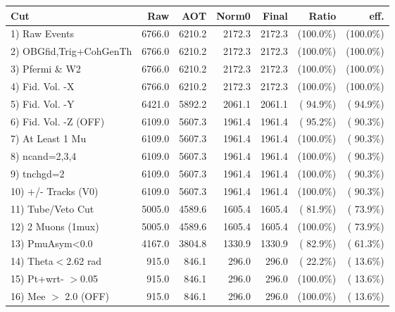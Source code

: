  \begin{table}[h!]\centering
 \begin{tabular}{||l||r|r|r|r|r|r||}
 \hline
 \hline
 Cut & Raw & AOT & Norm0 & Final & Ratio & eff.       \\
 \hline
  1) Raw Events           &       6766.0 &       6210.2 &       2172.3 &       2172.3 & (100.0\%) & (100.0\%) \\
  2) OBGfid,Trig+CohGenTh &       6766.0 &       6210.2 &       2172.3 &       2172.3 & (100.0\%) & (100.0\%) \\
  3) Pfermi \& W2         &       6766.0 &       6210.2 &       2172.3 &       2172.3 & (100.0\%) & (100.0\%) \\
  4) Fid. Vol. -X         &       6766.0 &       6210.2 &       2172.3 &       2172.3 & (100.0\%) & (100.0\%) \\
  5) Fid. Vol. -Y         &       6421.0 &       5892.2 &       2061.1 &       2061.1 & ( 94.9\%) & ( 94.9\%) \\
  6) Fid. Vol. -Z (OFF)   &       6109.0 &       5607.3 &       1961.4 &       1961.4 & ( 95.2\%) & ( 90.3\%) \\
  7) At Least 1 Mu        &       6109.0 &       5607.3 &       1961.4 &       1961.4 & (100.0\%) & ( 90.3\%) \\
  8) ncand=2,3,4          &       6109.0 &       5607.3 &       1961.4 &       1961.4 & (100.0\%) & ( 90.3\%) \\
  9) tnchgd=2             &       6109.0 &       5607.3 &       1961.4 &       1961.4 & (100.0\%) & ( 90.3\%) \\
 10) +/- Tracks (V0)      &       6109.0 &       5607.3 &       1961.4 &       1961.4 & (100.0\%) & ( 90.3\%) \\
 11) Tube/Veto Cut        &       5005.0 &       4589.6 &       1605.4 &       1605.4 & ( 81.9\%) & ( 73.9\%) \\
 12) 2 Muons (1mux)       &       5005.0 &       4589.6 &       1605.4 &       1605.4 & (100.0\%) & ( 73.9\%) \\
 13) PmuAsym<0.0          &       4167.0 &       3804.8 &       1330.9 &       1330.9 & ( 82.9\%) & ( 61.3\%) \\
 14) Theta$<$2.62 rad     &        915.0 &        846.1 &        296.0 &        296.0 & ( 22.2\%) & ( 13.6\%) \\
 15) Pt+wrt- $>$0.05      &        915.0 &        846.1 &        296.0 &        296.0 & (100.0\%) & ( 13.6\%) \\
 16) Mee $>$ 2.0  (OFF)   &        915.0 &        846.1 &        296.0 &        296.0 & (100.0\%) & ( 13.6\%) \\

\end{tabular}
\end{table}
